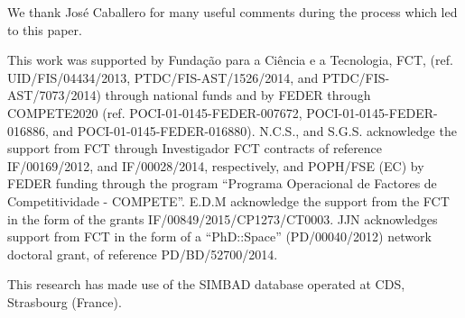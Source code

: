 \documentclass{aa}
\begin{document}
\begin{acknowledgements}

We thank Jos\'e Caballero for many useful comments during the process which
led to this paper.

This work was supported by Funda\c{c}\~ao para a Ci\^encia e a Tecnologia, FCT,
(ref. UID/FIS/04434/2013, PTDC/FIS-AST/1526/2014, and PTDC/FIS-AST/7073/2014)
through national funds and by FEDER through COMPETE2020 (ref.
POCI-01-0145-FEDER-007672, POCI-01-0145-FEDER-016886, and
POCI-01-0145-FEDER-016880). N.C.S., and S.G.S. acknowledge the support from FCT
through Investigador FCT contracts of reference IF/00169/2012, and
IF/00028/2014, respectively, and POPH/FSE (EC) by FEDER funding through the
program “Programa Operacional de Factores de Competitividade - COMPETE”. E.D.M
acknowledge the support from the FCT in the form of the grants
IF/00849/2015/CP1273/CT0003. JJN acknowledges support from FCT in the form of a
“PhD::Space” (PD/00040/2012) network doctoral grant, of reference
PD/BD/52700/2014.

This research has made use of the SIMBAD database operated at CDS, Strasbourg
(France).

\end{acknowledgements}




\end{document}
